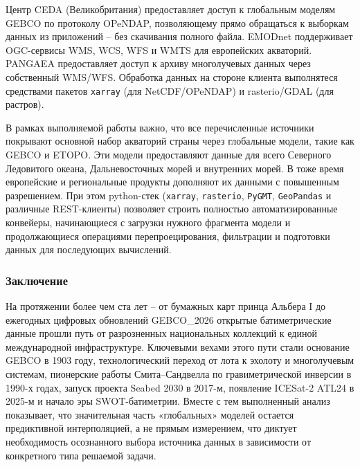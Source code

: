 Центр CEDA (Великобритания) предоставляет доступ к глобальным моделям GEBCO по протоколу OPeNDAP, позволяющему прямо обращаться к выборкам данных из приложений -- без скачивания полного файла. 
EMODnet поддерживает OGC-сервисы WMS, WCS, WFS и WMTS для европейских акваторий. 
PANGAEA предоставляет доступ к архиву многолучевых данных через собственный WMS/WFS.
Обработка данных на стороне клиента выполнятеся средствами пакетов \texttt{xarray} (для NetCDF/OPeNDAP) и rasterio/GDAL (для растров). 

В рамках выполняемой работы важно, что все перечисленные источники покрывают основной набор акваторий страны через глобальные модели, такие как GEBCO и ETOPO.
Эти модели предоставляют данные для всего Северного Ледовитого океана, Дальневосточных морей и внутренних морей.
В тоже время европейские и региональные продукты дополняют их данными с повышенным разрешением. 
При этом python-стек (\texttt{xarray}, \texttt{rasterio}, \texttt{PyGMT}, \texttt{GeoPandas} и различные REST-клиенты) позволяет строить полностью автоматизированные конвейеры, начинающиеся с загрузки нужного фрагмента модели и продолжающиеся операциями перепроецирования, фильтрации и подготовки данных для последующих вычислений.

\subsubsection{Заключение}

На протяжении более чем ста лет -- от бумажных карт принца Альбера I до ежегодных цифровых обновлений GEBCO\_2026 открытые батиметрические данные прошли путь от разрозненных национальных коллекций к единой международной инфраструктуре. 
Ключевыми вехами этого пути стали основание GEBCO в 1903 году, технологический переход от лота к эхолоту и многолучевым системам, пионерские работы Смита–Сандвелла по гравиметрической инверсии в 1990-х годах, запуск проекта Seabed 2030 в 2017-м, появление ICESat-2 ATL24 в 2025-м и начало эры SWOT-батиметрии. 
Вместе с тем выполненный анализ показывает, что значительная часть «глобальных» моделей остается предиктивной интерполяцией, а не прямым измерением, что диктует необходимость осознанного выбора источника данных в зависимости от конкретного типа решаемой задачи.
